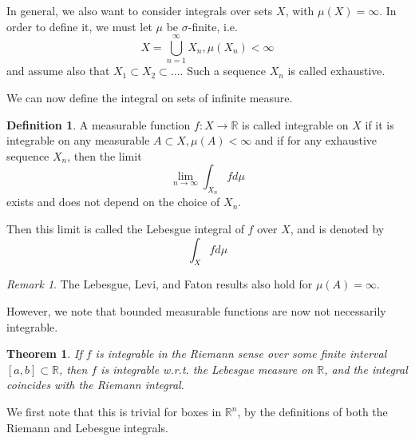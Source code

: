\documentclass[11pt,a4paper]{report}
\theoremstyle{plain}
\newtheorem{thm}{Theorem}[section]
\theoremstyle{definition}
\newtheorem*{defn}{Definition}
\theoremstyle{remark}
\newtheorem*{rem}{Remark}
\newcommand{\Union}{\bigcup}
\newcommand{\R}{\mathbb{R}}
\begin{document}
In general, we also want to consider integrals over sets $X$, with $\mu(X) = \infty$. In order to define it, we must let $\mu$ be $\sigma$-finite, i.e.
$$ X = \Union_{n=1}^\infty X_n, \mu(X_n) < \infty $$
and assume also that $X_1 \subset X_2 \subset \dots$. Such a sequence $X_n$ is called exhaustive.

We can now define the integral on sets of infinite measure.

\begin{defn}
    A measurable function $f : X \rightarrow \R $ is called integrable on $X$ if it is integrable on any measurable $A \subset X, \mu(A) < \infty$ and if for any exhaustive sequence $X_n$, then the limit
    $$ \lim_{n \rightarrow \infty} \int_{X_n} f d \mu $$
    exists and does not depend on the choice of $X_n$.

    Then this limit is called the Lebesgue integral of $f$ over $X$, and is denoted by
    $$ \int_X f d\mu $$
\end{defn}

\begin{rem}
    The Lebesgue, Levi, and Faton results also hold for $\mu(A) = \infty$.
\end{rem}

However, we note that bounded measurable functions are now not necessarily integrable.

\begin{thm}
    If $f$ is integrable in the Riemann sense over some finite interval $[a, b] \subset \R$, then $f$ is integrable w.r.t. the Lebesgue measure on $\R$, and the integral coincides with the Riemann integral.
\end{thm}
    
We first note that this is trivial for boxes in $\R^n$, by the definitions of both the Riemann and Lebesgue integrals. 
\end{document}
